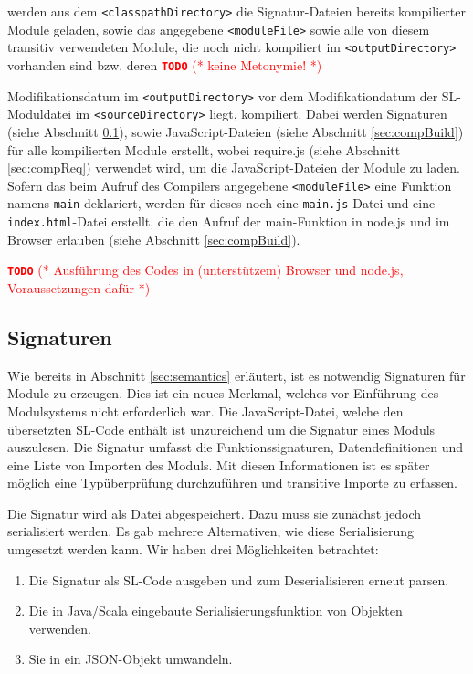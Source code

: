 \documentclass[runningheads]{llncs}
\newcommand{\TODO}[1]{ \textcolor{red}{\textbf{\texttt{\large{TODO}}} (* #1 *)}\par}
\begin{document}
werden aus dem \texttt{<classpathDirectory>} die Signatur-Dateien
bereits kompilierter Module geladen, sowie das angegebene
\texttt{<moduleFile>} sowie alle von diesem transitiv verwendeten Module,
die noch nicht kompiliert im \texttt{<outputDirectory>} vorhanden sind
bzw. deren \TODO{keine Metonymie!} Modifikationsdatum im
\texttt{<outputDirectory>} vor dem Modifikationdatum der
SL-Moduldatei im \texttt{<sourceDirectory>} liegt, kompiliert. Dabei
werden Signaturen (siehe Abschnitt \ref{sec:compSig}), sowie
JavaScript-Dateien (siehe Abschnitt \ref{sec:compBuild}) für alle
kompilierten Module erstellt, wobei require.js (siehe Abschnitt
\ref{sec:compReq}) verwendet wird, um die JavaScript-Dateien der
Module zu laden. Sofern das beim Aufruf des Compilers angegebene
\texttt{<moduleFile>} eine Funktion namens
\texttt{main} deklariert, werden für dieses noch eine
\texttt{main.js}-Datei und eine \texttt{index.html}-Datei erstellt,
die den Aufruf der main-Funktion in node.js und im Browser erlauben
(siehe Abschnitt \ref{sec:compBuild}).

\TODO{Ausführung des Codes in (unterstützem) Browser und node.js,
Voraussetzungen dafür}

\subsection{Signaturen}
\label{sec:compSig}

Wie bereits in Abschnitt \ref{sec:semantics} erläutert, ist es notwendig Signaturen für Module zu erzeugen. Dies ist ein neues Merkmal, welches vor Einführung des Modulsystems nicht erforderlich war. Die JavaScript-Datei, welche den übersetzten SL-Code enthält ist unzureichend um die Signatur eines Moduls auszulesen. Die Signatur umfasst die Funktionssignaturen, Datendefinitionen und eine Liste von Importen des Moduls. Mit diesen Informationen ist es später möglich eine Typüberprüfung durchzuführen und transitive Importe zu erfassen.

Die Signatur wird als Datei abgespeichert. Dazu muss sie zunächst jedoch serialisiert werden. Es gab mehrere Alternativen, wie diese Serialisierung umgesetzt werden kann. Wir haben drei Möglichkeiten betrachtet:

\begin{enumerate}
 \item Die Signatur als SL-Code ausgeben und zum Deserialisieren erneut parsen.
 \item Die in Java/Scala eingebaute Serialisierungsfunktion von Objekten verwenden.
 \item Sie in ein JSON-Objekt umwandeln.
\end{enumerate}
\end{document}

